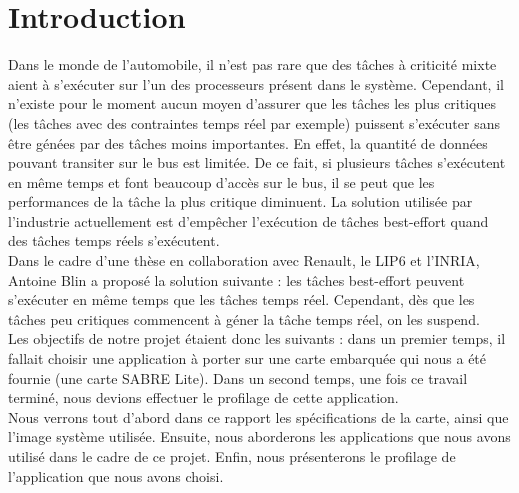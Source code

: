 \section*{Introduction}

Dans le monde de l'automobile, il n'est pas rare que des tâches à criticité 
mixte aient à s'exécuter sur l'un des processeurs présent dans le système. 
Cependant, il n'existe pour le moment aucun moyen d'assurer que les tâches les 
plus critiques (les tâches avec des contraintes temps réel par exemple) puissent
s'exécuter sans être génées par des tâches moins importantes. En effet, la 
quantité de données pouvant transiter sur le bus est limitée. De ce fait, si 
plusieurs tâches s'exécutent en même temps et font beaucoup d'accès sur le bus, 
il se peut que les performances de la tâche la plus critique diminuent. La 
solution utilisée par l'industrie actuellement est d'empêcher l'exécution de 
tâches best-effort quand des tâches temps réels s'exécutent. \\

Dans le cadre d'une thèse en collaboration avec Renault, le LIP6 et l'INRIA, 
Antoine Blin a proposé la solution suivante : les tâches best-effort peuvent 
s'exécuter en même temps que les tâches temps réel. Cependant, dès que les 
tâches peu critiques commencent à géner la tâche temps réel, on les suspend.\\

Les objectifs de notre projet étaient donc les suivants : dans un premier temps,
il fallait choisir une application à porter sur une carte embarquée qui nous a 
été fournie (une carte SABRE Lite). Dans un second temps, une fois ce travail 
terminé, nous devions effectuer le profilage de cette application. \\

Nous verrons tout d'abord dans ce rapport les spécifications de la carte, ainsi
que l'image système utilisée. Ensuite, nous aborderons les applications que nous
avons utilisé dans le cadre de ce projet. Enfin, nous présenterons le profilage de
l'application que nous avons choisi.
